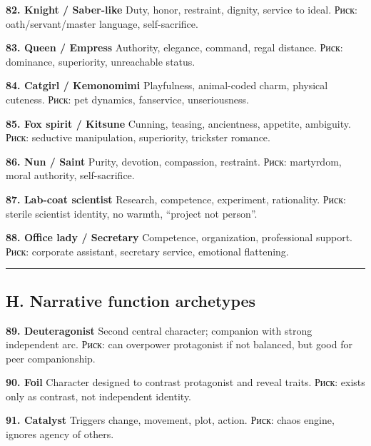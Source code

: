 \textbf{82. Knight /\hspace{0pt} Saber-like} Duty, honor, restraint, dignity,
service to ideal. Риск: oath/\hspace{0pt}servant/\hspace{0pt}master language, self-sacrifice.

\textbf{83. Queen /\hspace{0pt} Empress} Authority, elegance, command, regal
distance. Риск: dominance, superiority, unreachable status.

\textbf{84. Catgirl /\hspace{0pt} Kemonomimi} Playfulness, animal-coded charm,
physical cuteness. Риск: pet dynamics, fanservice, unseriousness.

\textbf{85. Fox spirit /\hspace{0pt} Kitsune} Cunning, teasing, ancientness,
appetite, ambiguity. Риск: seductive manipulation, superiority,
trickster romance.

\textbf{86. Nun /\hspace{0pt} Saint} Purity, devotion, compassion, restraint. Риск:
martyrdom, moral authority, self-sacrifice.

\textbf{87. Lab-coat scientist} Research, competence, experiment,
rationality. Риск: sterile scientist identity, no warmth, ``project not
person''.

\textbf{88. Office lady /\hspace{0pt} Secretary} Competence, organization,
professional support. Риск: corporate assistant, secretary service,
emotional flattening.

\begin{center}\rule{0.5\linewidth}{0.5pt}\end{center}

\subsection*{H. Narrative function archetypes}

\textbf{89. Deuteragonist} Second central character; companion with
strong independent arc. Риск: can overpower protagonist if not balanced,
but good for peer companionship.

\textbf{90. Foil} Character designed to contrast protagonist and reveal
traits. Риск: exists only as contrast, not independent identity.

\textbf{91. Catalyst} Triggers change, movement, plot, action. Риск:
chaos engine, ignores agency of others.

